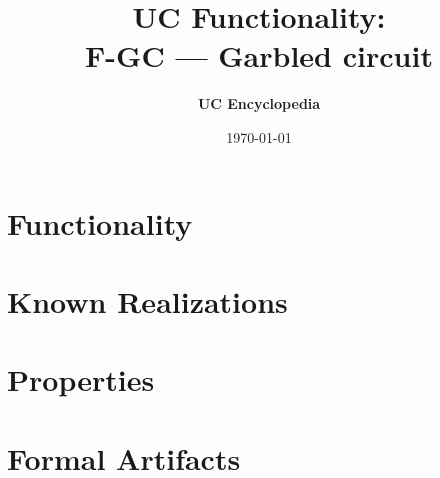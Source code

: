\documentclass[11pt,a4paper]{article}
\title{\textbf{\Large UC Functionality:}\\[0.2em] \Large F-GC --- Garbled circuit}
\author{\textbf{UC Encyclopedia}}
\date{\today}
\newtheorem{functionality}{Functionality}
\begin{document}
\maketitle

\begin{abstract}
\end{abstract}

\section{Functionality}

%

\section{Known Realizations}


\section{Properties}


\section{Formal Artifacts}

\end{document}
